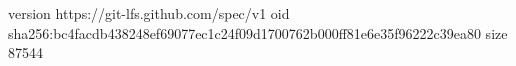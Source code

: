 version https://git-lfs.github.com/spec/v1
oid sha256:bc4facdb438248ef69077ec1c24f09d1700762b000ff81e6e35f96222c39ea80
size 87544
